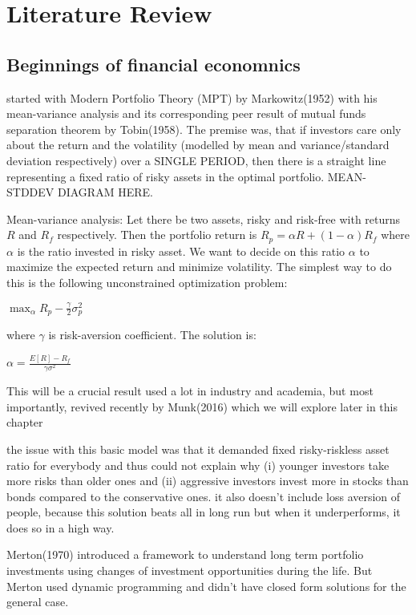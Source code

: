 \chapter{Literature Review}
\label{litreview}

\section{Beginnings of financial economnics}
\item started with Modern Portfolio Theory (MPT) by Markowitz(1952) with his mean-variance analysis and its corresponding peer result of mutual funds separation theorem by Tobin(1958). The premise was, that if investors care only about the return and the volatility (modelled by mean and variance/standard deviation respectively) over a SINGLE PERIOD, then there is a straight line representing a fixed ratio of risky assets in the optimal portfolio. MEAN-STDDEV DIAGRAM HERE.

  Mean-variance analysis:
  Let there be two assets, risky and risk-free with returns $R$ and $R_f$ respectively. Then the portfolio return is $R_p = \alpha R + (1-\alpha) R_f$ where $\alpha$ is the ratio invested in risky asset. We want to decide on this ratio $\alpha$ to maximize the expected return and minimize volatility. The simplest way to do this is the following unconstrained optimization problem:
  \begin{center}
    $\max_{\alpha} {R_p - \frac{\gamma}{2}\sigma^2_p}$
  \end{center}

where $\gamma$ is risk-aversion coefficient. The solution is:

  \begin{center}
    $\alpha = \frac{E[R] - R_f}{\gamma\sigma^2}$
  \end{center}

  This will be a crucial result used a lot in industry and academia, but most importantly, revived recently by Munk(2016) which we will explore later in this chapter
  
\item the issue with this basic model was that it demanded fixed risky-riskless asset ratio for everybody and thus could not explain why (i) younger investors take more risks than older ones and (ii) aggressive investors invest more in stocks than bonds compared to the conservative ones.
  it also doesn't include loss aversion of people, because this solution beats all in long run but when it underperforms, it does so in a high way. 
\item Merton(1970) introduced a framework to understand long term portfolio investments using changes of investment opportunities during the life. But Merton used dynamic programming and didn't have closed form solutions for the general case.

